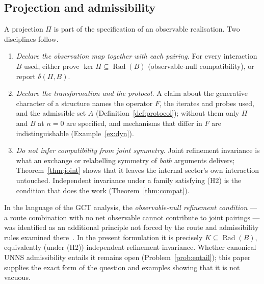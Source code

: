 \documentclass[11pt,a4paper]{article}
\newcommand{\Rad}{\operatorname{Rad}}
\newcommand{\defic}{\delta}
\theoremstyle{plain}
\theoremstyle{definition}
\begin{document}
\subsection{Projection and admissibility}
A projection $\Pi$ is part of the specification of an observable realisation. Two disciplines follow.
\begin{enumerate}[label=(D\arabic*)]
\item \emph{Declare the observation map together with each pairing.} For every interaction $B$ used, either prove $\ker\Pi\subseteq\Rad(B)$ (observable-null compatibility), or report $\defic(\Pi,B)$.
\item \emph{Declare the transformation and the protocol.} A claim about the generative character of a structure names the operator $F$, the iterates and probes used, and the admissible set $A$ (Definition~\ref{def:protocol}); without them only $\Pi$ and $B$ at $n=0$ are specified, and mechanisms that differ in $F$ are indistinguishable (Example~\ref{ex:dyn}).
\item \emph{Do not infer compatibility from joint symmetry.} Joint refinement invariance is what an exchange or relabelling symmetry of \emph{both} arguments delivers; Theorem~\ref{thm:joint} shows that it leaves the internal sector's own interaction untouched. Independent invariance under a family satisfying (H2) is the condition that does the work (Theorem~\ref{thm:compat}).
\end{enumerate}
In the language of the GCT analysis, the \emph{observable-null refinement condition} --- a route combination with no net observable cannot contribute to joint pairings --- was identified as an additional principle not forced by the route and admissibility rules examined there~\cite{G9}. In the present formulation it is precisely $K\subseteq\Rad(B)$, equivalently (under (H2)) independent refinement invariance. Whether canonical UNNS admissibility entails it remains open (Problem~\ref{prob:entail}); this paper supplies the exact form of the question and examples showing that it is not vacuous.
\end{document}
